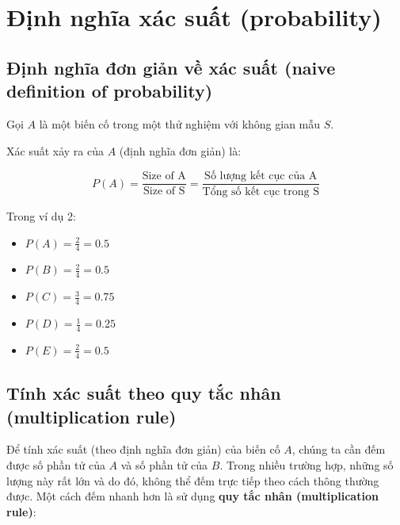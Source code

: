 \documentclass[
]{book}
\providecommand{\tightlist}{%
  \setlength{\itemsep}{0pt}\setlength{\parskip}{0pt}}
\begin{document}
\hypertarget{ux111ux1ecbnh-nghux129a-xuxe1c-suux1ea5t-probability}{%
\section{Định nghĩa xác suất (probability)}\label{ux111ux1ecbnh-nghux129a-xuxe1c-suux1ea5t-probability}}

\hypertarget{ux111ux1ecbnh-nghux129a-ux111ux1a1n-giux1ea3n-vux1ec1-xuxe1c-suux1ea5t-naive-definition-of-probability}{%
\subsection{Định nghĩa đơn giản về xác suất (naive definition of probability)}\label{ux111ux1ecbnh-nghux129a-ux111ux1a1n-giux1ea3n-vux1ec1-xuxe1c-suux1ea5t-naive-definition-of-probability}}

Gọi \(A\) là một biến cố trong một thử nghiệm với không gian mẫu \(S\).

Xác suất xảy ra của \(A\) (định nghĩa đơn giản) là:

\[
P(A) = \frac{\text{Size of A}}{\text{Size of S}} = \frac{\text{Số lượng kết cục của A}}{\text{Tổng số kết cục trong S}}
\]

Trong ví dụ 2:

\begin{itemize}
\tightlist
\item
  \(P(A) = \frac{2}{4} = 0.5\)
\item
  \(P(B) = \frac{2}{4} = 0.5\)
\item
  \(P(C) = \frac{3}{4} = 0.75\)
\item
  \(P(D) = \frac{1}{4} = 0.25\)
\item
  \(P(E) = \frac{2}{4} = 0.5\)
\end{itemize}

\hypertarget{tuxednh-xuxe1c-suux1ea5t-theo-quy-tux1eafc-nhuxe2n-multiplication-rule}{%
\subsection{Tính xác suất theo quy tắc nhân (multiplication rule)}\label{tuxednh-xuxe1c-suux1ea5t-theo-quy-tux1eafc-nhuxe2n-multiplication-rule}}

Để tính xác suất (theo định nghĩa đơn giản) của biến cố \(A\), chúng ta cần đếm được số phần tử của \(A\) và số phần tử của \(B\). Trong nhiều trường hợp, những số lượng này rất lớn và do đó, không thể đếm trực tiếp theo cách thông thường được. Một cách đếm nhanh hơn là sử dụng \textbf{quy tắc nhân (multiplication rule)}:
\end{document}

